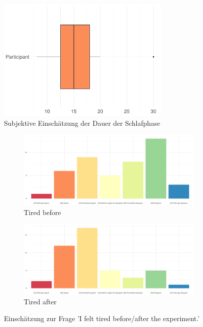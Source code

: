 \begin{figure}[H]
	\centering
	\includegraphics[width=0.75\textwidth]{./_StudyResults/subjectiveSleepDuration}
	\caption{Subjektive Einschätzung der Dauer der Schlafphase}
	\label{fig:subjectiveSleepDuration}
\end{figure}


\begin{figure}[H]
	\centering
	\begin{subfigure}{0.48\textwidth}
		\includegraphics[width=\textwidth]{./_StudyResults/tiredBefore}
		\caption{Tired before}
		\label{fig:tiredBefore}
	\end{subfigure}%
	\hfill
	\begin{subfigure}{0.48\textwidth}
		\includegraphics[width=\textwidth]{./_StudyResults/tiredAfter}
		\caption{Tired after}
		\label{fig:tiredAfter}
	\end{subfigure}
	\caption{Einschätzung zur Frage 'I felt tired before/after the experiment.'} %
\end{figure}

